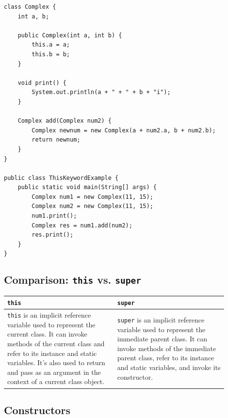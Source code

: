 \documentclass{book}
\begin{document}
\begin{verbatim}
class Complex {
    int a, b;

    public Complex(int a, int b) {
        this.a = a;
        this.b = b;
    }

    void print() {
        System.out.println(a + " + " + b + "i");
    }

    Complex add(Complex num2) {
        Complex newnum = new Complex(a + num2.a, b + num2.b);
        return newnum;
    }
}

public class ThisKeywordExample {
    public static void main(String[] args) {
        Complex num1 = new Complex(11, 15);
        Complex num2 = new Complex(11, 15);
        num1.print();
        Complex res = num1.add(num2);
        res.print();
    }
}
\end{verbatim}

\subsection{Comparison: \texttt{this} vs. \texttt{super}}

\begin{center}
	\begin{tabular}{|p{0.45\linewidth}|p{0.45\linewidth}|}
		\hline
		\textbf{\texttt{this}}                                                                                                                                                                                                                                                     & \textbf{\texttt{super}}                                                                                                                                                                                                     \\
		\hline
		\texttt{this} is an implicit reference variable used to represent the current class. It can invoke methods of the current class and refer to its instance and static variables. It's also used to return and pass as an argument in the context of a current class object. & \texttt{super} is an implicit reference variable used to represent the immediate parent class. It can invoke methods of the immediate parent class, refer to its instance and static variables, and invoke its constructor. \\
		\hline
	\end{tabular}
\end{center}

\subsection{Constructors}
\end{document}
